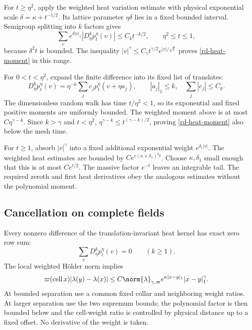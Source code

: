 For $t\ge\eta^2$, apply the weighted heat variation estimate with
physical exponential scale $\delta=\kappa+t^{-1/2}$. Its lattice
parameter $\eta\delta$ lies in a fixed bounded interval. Semigroup
splitting into $k$ factors gives
\[
 \sum_v e^{\delta|v|_1}|D_\eta^kp_t^\eta(v)|
                \le C_kt^{-k/2},\qquad \eta^2\le t\le1,
\]
because $\delta^2t$ is bounded. The inequality
$|v|^\gamma\le C_\gamma t^{\gamma/2}e^{|v|/\sqrt t}$
proves \eqref{rd-heat-moment} in this range.

For $0<t<\eta^2$, expand the finite difference into its fixed list
of translates:
\[
 D_\eta^kp_t^\eta(v)
    =\eta^{-k}\sum_jc_jp_t^\eta(v+\eta a_j),
 \qquad |a_j|_1\le k,\quad\sum_j|c_j|\le C_k.
\]
The dimensionless random walk has time $t/\eta^2<1$, so its
exponential and fixed positive moments are uniformly bounded.
The weighted moment above is at most $C\eta^{\gamma-k}$.
Since $k>\gamma$ and $t<\eta^2$,
$\eta^{\gamma-k}\le t^{(\gamma-k)/2}$, proving
\eqref{rd-heat-moment} also below the mesh time.

For $t\ge1$, absorb $|v|^\gamma$ into a fixed additional
exponential weight $e^{\delta_1|v|}$. The weighted heat estimates
are bounded by $Ce^{c(\kappa+\delta_1)^2t}$. Choose
$\kappa,\delta_1$ small enough that this is at most $Ce^{t/2}$.
The massive factor $e^{-t}$ leaves an integrable tail. The required
zeroth and first heat derivatives obey the analogous estimates
without the polynomial moment.

\subsection{Cancellation on complete fields}

Every nonzero difference of the translation-invariant heat kernel
has exact zero row sum:
\begin{equation}\label{rd-zero-row}
 \sum_vD_\eta^kp_t^\eta(v)=0\qquad(k\ge1).
\end{equation}
The local weighted H\"older norm implies
\begin{equation}\label{rd-global-increment}
 \varpi(\operatorname{cell}x)|\lambda(y)-\lambda(x)|
 \le C\norm{\lambda}_{\gamma,\varpi}
        e^{\kappa|x-y|_1}|x-y|_1^\gamma.
\end{equation}
At bounded separation use a common fixed collar and neighboring
weight ratios. At larger separation use the two supremum bounds;
the polynomial factor is then bounded below and the cell-weight
ratio is controlled by physical distance up to a fixed offset.
No derivative of the weight is taken.

